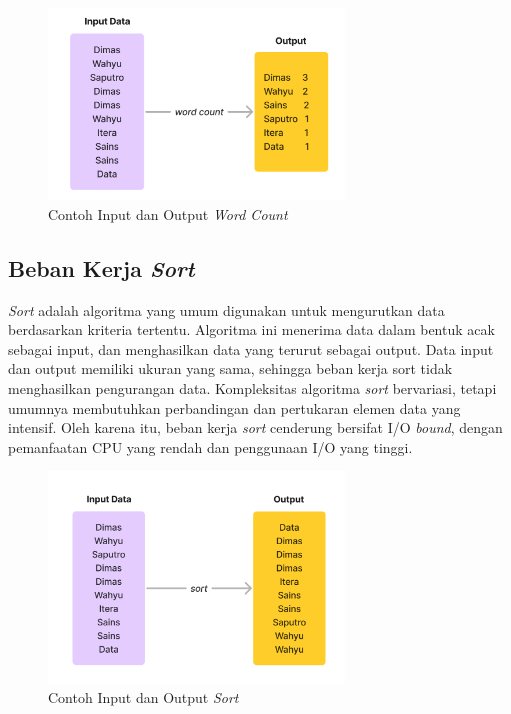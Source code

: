 \begin{figure}[h]
    \centering
    \includegraphics[width=0.7\textwidth]{figures/ch02/sample-wordcount.png}
    \caption{Contoh Input dan Output \textit{Word Count}}
    \label{fig:sample-wordcount}
\end{figure}

\subsection{Beban Kerja \textit{Sort}}
\textit{Sort} adalah algoritma yang umum digunakan untuk mengurutkan data berdasarkan kriteria tertentu. Algoritma ini menerima data dalam bentuk acak sebagai input, dan menghasilkan data yang terurut sebagai output. Data input dan output memiliki ukuran yang sama, sehingga beban kerja sort tidak menghasilkan pengurangan data.
Kompleksitas algoritma \textit{sort} bervariasi, tetapi umumnya membutuhkan perbandingan dan pertukaran elemen data yang intensif. Oleh karena itu, beban kerja \textit{sort} cenderung bersifat I/O \textit{bound}, dengan pemanfaatan CPU yang rendah dan penggunaan I/O yang tinggi. 

\begin{figure}[h]
    \centering
    \includegraphics[width=0.7\textwidth]{figures/ch02/sample-sort}
    \caption{Contoh Input dan Output \textit{Sort}}
    \label{fig:sample-sort}
\end{figure}

